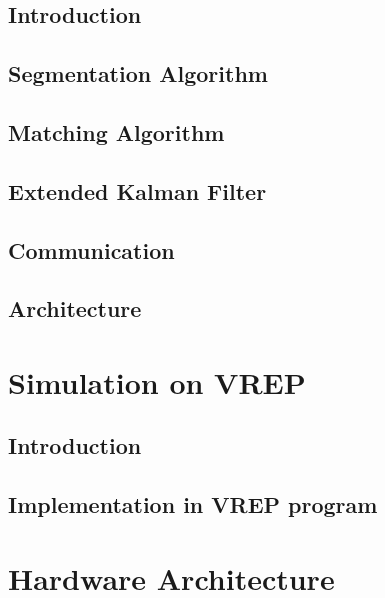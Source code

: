 \documentclass{book} %
\begin{document}
\section{Introduction}


\section{Segmentation Algorithm}


\section{Matching Algorithm}


\section{Extended Kalman Filter}


\section{Communication}


\section{Architecture}



\chapter{Simulation on VREP}
\section{Introduction}


\section{Implementation in VREP program}


\chapter{Hardware Architecture}
\end{document}
